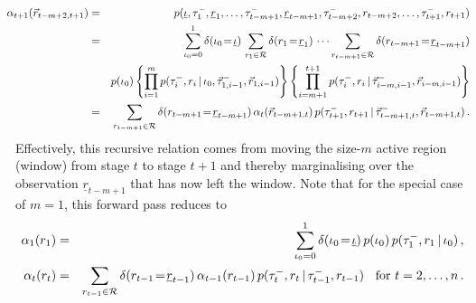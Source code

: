 \documentclass[a4paper]{article}
\newcommand{\ui}{\underline{\iota}}
\newcommand{\ur}{\underline{r}}
\newcommand{\vr}{\vec{r}}
\newcommand{\tm}{\tau^{-}}
\begin{document}
\begin{eqnarray}
\!\!\!\!\!
\alpha_{t+1}(\vr_{t-m+2,t+1}) & = & 
p(\ui,\tm_1,\ur_1,\ldots,\tm_{t-m+1},\ur_{t-m+1},\tm_{t-m+2},r_{t-m+2},\ldots,\tm_{t+1},r_{t+1})
\nonumber\\& = &
\sum_{\iota_0=0}^{1}\delta(\iota_0\!=\!\ui)\,
\sum_{r_1\in{\cal R}} \delta(r_1\!=\!\ur_1)\,
\cdots
\sum_{r_{t-m+1}\in{\cal R}} \delta(r_{t-m+1}\!=\!\ur_{t-m+1})
\nonumber\\&&
p(\iota_0)\left\{\prod_{i=1}^{m}p(\tm_i,r_i\,|\,\iota_0,\vec{\tau}^-_{1,i-1},\vr_{1,i-1})\right\}
\left\{\prod_{i=m+1}^{t+1}p(\tm_i,r_i\,|\,\vec{\tau}^-_{i-m,i-1},\vr_{i-m,i-1})\right\}
\nonumber\\& = &\!\!\!
\sum_{r_{t-m+1}\in{\cal R}} \delta(r_{t-m+1}\!=\!\ur_{t-m+1})\,\alpha_t(\vr_{t-m+1,t})
\,p(\tm_{t+1},r_{t+1}\,|\,\vec{\tau}^-_{t-m+1,t},\vr_{t-m+1,t})\,.
\label{eq:fwd-pass-m-recursive}
\end{eqnarray}
Effectively, this recursive relation comes from moving the size-$m$ active region (window) from stage $t$ to stage $t+1$ and thereby marginalising over the
observation $\ur_{t-m+1}$ that has now left the window.
Note that for the special case of $m=1$, this forward pass reduces to
\begin{eqnarray}
\alpha_1(r_1) & = &  \sum_{\iota_0=0}^{1}\delta(\iota_0\!=\!\ui)\,
p(\iota_0)\,p(\tm_1,r_1\,|\,\iota_0)\,,
\nonumber\\
\alpha_{t}(r_{t}) & = &
\sum_{r_{t-1}\in{\cal R}} \delta(r_{t-1}\!=\!\ur_{t-1})\,\alpha_{t-1}(r_{t-1})
\,p(\tm_{t},r_{t}\,|\,\tm_{t-1},r_{t-1})
\hspace*{2mm}\mbox{ for $t=2,\ldots,n$}
\,.
\end{eqnarray}
\end{document}
